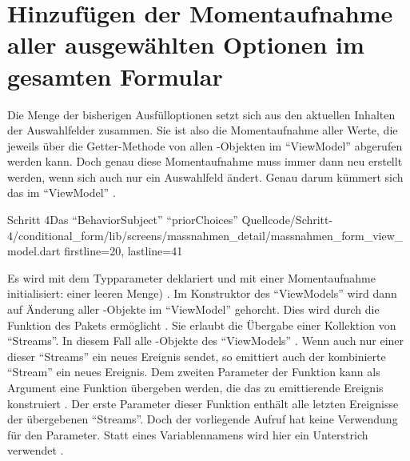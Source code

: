 \section{Hinzufügen der Momentaufnahme aller ausgewählten Optionen im gesamten Formular}

Die Menge der bisherigen Ausfülloptionen setzt sich aus den aktuellen Inhalten der Auswahlfelder zusammen.
Sie ist also die Momentaufnahme aller Werte,
die jeweils über die Getter-Methode  von allen -Objekten im \enquote{ViewModel} abgerufen werden kann.
Doch genau diese Momentaufnahme muss immer dann neu erstellt werden,
wenn sich auch nur ein Auswahlfeld ändert.
Genau darum kümmert sich das   im \enquote{ViewModel} \Lst{\ref{lst:Schritt4priorChoices}}.

\begin{alexlisting}{Schritt 4}{Das \enquote{BehaviorSubject} \enquote{priorChoices}}
  {Quellcode/Schritt-4/conditional_form/lib/screens/massnahmen_detail/massnahmen_form_view_model.dart}
  {firstline=20, lastline=41}
  \label{lst:Schritt4priorChoices}
\end{alexlisting}

Es wird mit dem Typparameter  deklariert  und mit einer Momentaufnahme initialisiert: einer leeren Menge) .
Im Konstruktor des \enquote{ViewModels} wird dann auf Änderung aller -Objekte im \enquote{ViewModel} gehorcht.
Dies wird durch die Funktion  des Pakets  ermöglicht .
Sie erlaubt die Übergabe einer Kollektion von \enquote{Streams}.
In diesem Fall alle -Objekte des \enquote{ViewModels} .
Wenn auch nur einer dieser \enquote{Streams} ein neues Ereignis sendet,
so emittiert auch der kombinierte \enquote{Stream} ein neues Ereignis.
Dem zweiten Parameter der Funktion  kann als Argument eine Funktion übergeben werden,
die das zu emittierende Ereignis konstruiert .
Der erste Parameter dieser Funktion enthält alle letzten Ereignisse der übergebenen \enquote{Streams}.
Doch der vorliegende Aufruf hat keine Verwendung für den Parameter.
Statt eines Variablennamens wird hier ein Unterstrich \IC{_} verwendet .

